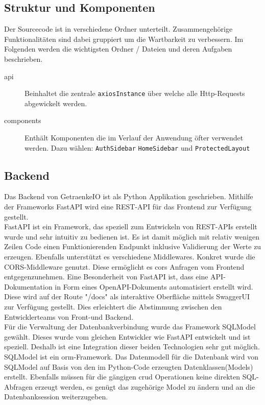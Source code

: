\documentclass[conference,a4paper]{cs-techrep}
\begin{document}
\subsection{Struktur und Komponenten}
Der Sourcecode ist in verschiedene Ordner unterteilt.  Zusammengehörige Funktionalitäten sind dabei gruppiert um die Wartbarkeit zu verbessern. Im Folgenden werden die wichtigsten Ordner / Dateien und deren Aufgaben beschrieben.

\begin{description}
	\item[api] Beinhaltet die zentrale \texttt{axiosInstance} über welche alle Http-Requests abgewickelt werden.
	\item[components] Enthält Komponenten die im Verlauf der Anwendung öfter verwendet werden. Dazu wählen: \texttt{AuthSidebar} \texttt{HomeSidebar} und \texttt{ProtectedLayout}
\end{description}

\subsection{Backend} %
Das Backend von GetraenkeIO ist als Python Applikation geschrieben.
Mithilfe der Frameworks FastAPI wird eine REST-API für das Frontend zur Verfügung gestellt. \\  
FastAPI ist ein Framework, das speziell zum Entwickeln von REST-APIs erstellt wurde und sehr intuitiv zu bedienen ist.
Es ist damit möglich mit relativ wenigen Zeilen Code einen Funktionierenden Endpunkt inklusive Validierung der Werte zu erzeugen. Ebenfalls unterstützt es verschiedene Middlewares. Konkret wurde die CORS-Middleware genutzt. Diese ermöglicht es \ac{cors} Anfragen vom Frontend entgegenzunehmen.
Eine Besonderheit von FastAPI ist, dass eine API-Dokumentation in Form eines OpenAPI-Dokuments \cite{openapi} automatisiert erstellt wird. Diese wird auf der Route "/docs" als interaktive Oberfläche mittels SwaggerUI  \cite{swagger} zur Verfügung gestellt. Dies erleichtert die Abstimmung zwischen den Entwicklerteams von Front-und Backend. \\  
Für die Verwaltung der Datenbankverbindung wurde das Framework SQLModel gewählt. Dieses wurde vom gleichen Entwickler wie FastAPI entwickelt und ist speziell. Deshalb ist eine Integration dieser beiden Technologien sehr gut möglich. SQLModel ist ein \ac{orm}-Framework.
Das Datenmodell für die Datenbank wird von SQLModel auf Basis von den im Python-Code erzeugten Datenklassen(Models) erstellt. Ebenfalls müssen für die gängigen \ac{crud} Operationen keine direkten SQL-Abfragen erzeugt werden, es genügt das zugehörige Model  zu ändern und an die Datenbanksession weiterzugeben.
\end{document}
